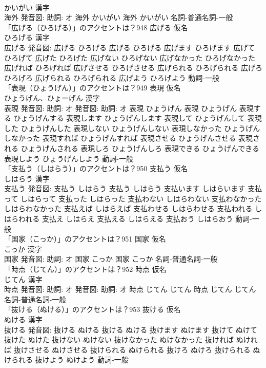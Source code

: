 \documentclass[8pt]{extreport}
\begin{document}
\begin{CJK}{UTF8}{min}
\\	かいがい 漢字　
\\	海外 発音図: 助詞: オ	海外 かいがい		海外 かいがい				名詞-普通名詞-一般 
\\	「広げる（ひろげる）」のアクセントは？948	広げる 仮名　
\\	ひろげる 漢字　
\\	広げる 発音図:	広げる ひろげる		広げる ひろげる 広げます ひろげます 広げて ひろげて 広げた ひろげた 広げない ひろげない 広げなかった ひろげなかった 広げれば ひろげれば 広げさせる ひろげさせる 広げられる ひろげられる 広げろ ひろげろ 広げられる ひろげられる 広げよう ひろげよう				動詞-一般 
\\	「表現（ひょうげん）」のアクセントは？949	表現 仮名　
\\	ひょうげん、ひょーげん 漢字　
\\	表現 発音図: 助詞: オ 発音図: 助詞: オ	表現 ひょうげん		表現 ひょうげん 表現する ひょうげんする 表現します ひょうげんします 表現して ひょうげんして 表現した ひょうげんした 表現しない ひょうげんしない 表現しなかった ひょうげんしなかった 表現すれば ひょうげんすれば 表現させる ひょうげんさせる 表現される ひょうげんされる 表現しろ ひょうげんしろ 表現できる ひょうげんできる 表現しよう ひょうげんしよう				動詞-一般 
\\	「支払う（しはらう）」のアクセントは？950	支払う 仮名　
\\	しはらう 漢字　
\\	支払う 発音図:	支払う しはらう		支払う しはらう 支払います しはらいます 支払って しはらって 支払った しはらった 支払わない しはらわない 支払わなかった しはらわなかった 支払えば しはらえば 支払わせる しはらわせる 支払われる しはらわれる 支払え しはらえ 支払える しはらえる 支払おう しはらおう				動詞-一般 
\\	「国家（こっか）」のアクセントは？951	国家 仮名　
\\	こっか 漢字　
\\	国家 発音図: 助詞: オ	国家 こっか		国家 こっか				名詞-普通名詞-一般 
\\	「時点（じてん）」のアクセントは？952	時点 仮名　
\\	じてん 漢字　
\\	時点 発音図: 助詞: オ 発音図: 助詞: オ	時点 じてん じてん		時点 じてん じてん				名詞-普通名詞-一般 
\\	「抜ける（ぬける）」のアクセントは？953	抜ける 仮名　
\\	ぬける 漢字　
\\	抜ける 発音図:	抜ける ぬける		抜ける ぬける 抜けます ぬけます 抜けて ぬけて 抜けた ぬけた 抜けない ぬけない 抜けなかった ぬけなかった 抜ければ ぬければ 抜けさせる ぬけさせる 抜けられる ぬけられる 抜けろ ぬけろ 抜けられる ぬけられる 抜けよう ぬけよう				動詞-一般 

\end{CJK}
\end{document}
